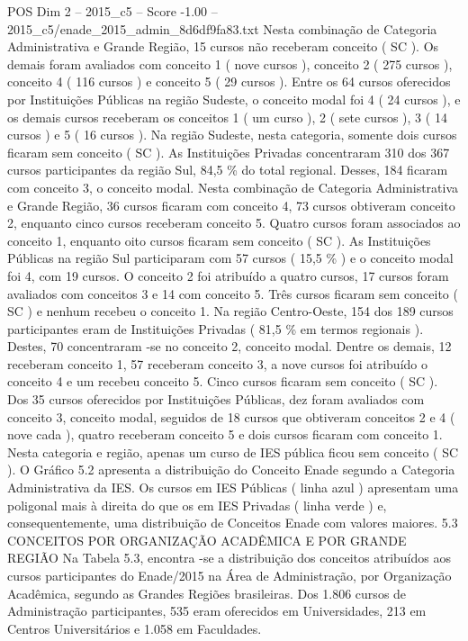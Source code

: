 \begin{textsample}{POS Dim 2 – 2015\_c5 – Score -1.00 – 2015\_c5/enade\_2015\_admin\_8d6df9fa83.txt}
Nesta combinação de Categoria Administrativa e Grande Região, 15 cursos não receberam conceito ( SC ).
Os demais foram avaliados com conceito 1 ( nove cursos ), conceito 2 ( 275 cursos ), conceito 4 ( 116 cursos ) e conceito 5 ( 29 cursos ).
Entre os 64 cursos oferecidos por Instituições Públicas na região Sudeste, o conceito modal foi 4 ( 24 cursos ), e os demais cursos receberam os conceitos 1 ( um curso ), 2 ( sete cursos ), 3 ( 14 cursos ) e 5 ( 16 cursos ).
Na região Sudeste, nesta categoria, somente dois cursos ficaram sem conceito ( SC ).
As Instituições Privadas concentraram 310 dos 367 cursos participantes da região Sul, 84,5 \% do total regional.
Desses, 184 ficaram com conceito 3, o conceito modal.
Nesta combinação de Categoria Administrativa e Grande Região, 36 cursos ficaram com conceito 4, 73 cursos obtiveram conceito 2, enquanto cinco cursos receberam conceito 5.
Quatro cursos foram associados ao conceito 1, enquanto oito cursos ficaram sem conceito ( SC ).
As Instituições Públicas na região Sul participaram com 57 cursos ( 15,5 \% ) e o conceito modal foi 4, com 19 cursos.
O conceito 2 foi atribuído a quatro cursos, 17 cursos foram avaliados com conceitos 3 e 14 com conceito 5.
Três cursos ficaram sem conceito ( SC ) e nenhum recebeu o conceito 1.
Na região Centro-Oeste, 154 dos 189 cursos participantes eram de Instituições Privadas ( 81,5 \% em termos regionais ).
Destes, 70 concentraram -se no conceito 2, conceito modal.
Dentre os demais, 12 receberam conceito 1, 57 receberam conceito 3, a nove cursos foi atribuído o conceito 4 e um recebeu conceito 5.
Cinco cursos ficaram sem conceito ( SC ).
Dos 35 cursos oferecidos por Instituições Públicas, dez foram avaliados com conceito 3, conceito modal, seguidos de 18 cursos que obtiveram conceitos 2 e 4 ( nove cada ), quatro receberam conceito 5 e dois cursos ficaram com conceito 1.
Nesta categoria e região, apenas um curso de IES pública ficou sem conceito ( SC ).
O Gráfico 5.2 apresenta a distribuição do Conceito Enade segundo a Categoria Administrativa da IES.
Os cursos em IES Públicas ( linha azul ) apresentam uma poligonal mais à direita do que os em IES Privadas ( linha verde ) e, consequentemente, uma distribuição de Conceitos Enade com valores maiores. 5.3 CONCEITOS POR ORGANIZAÇÃO ACADÊMICA E POR GRANDE REGIÃO Na Tabela 5.3, encontra -se a distribuição dos conceitos atribuídos aos cursos participantes do Enade/2015 na Área de Administração, por Organização Acadêmica, segundo as Grandes Regiões brasileiras.
Dos 1.806 cursos de Administração participantes, 535 eram oferecidos em Universidades, 213 em Centros Universitários e 1.058 em Faculdades.

\end{textsample}
